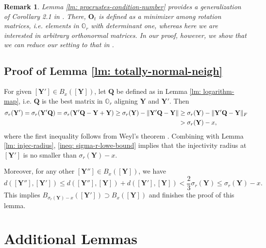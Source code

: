 \documentclass[11pt]{article}
\newtheorem{Remark}{Remark}
\newcommand{\0}{{\mathbf{0}}}
\newcommand{\1}{{\mathbf{1}}}
\renewcommand{\O}{{\mathbf{O}}}
\newcommand{\Q}{{\mathbf{Q}}}
\newcommand{\Y}{{\mathbf{Y}}}
\newcommand{\F}{{\rm F}}
\newcommand{\nc}{\normalcolor}
\begin{document}
 
\begin{Remark}
Lemma \ref{lm: procrustes-condition-number} provides a generalization of Corollary 2.1 in \cite{soderkvist1993perturbation}. There,  $\O_t$ is defined as a minimizer among \textit{rotation} matrices, i.e. elements in $\mathbb{O}_r$ with determinant one, whereas here we are interested in arbitrary orthonormal matrices. In our proof, however, we show that we can reduce our setting to that in \cite{soderkvist1993perturbation}.
\end{Remark}



\nc



\subsection{Proof of Lemma \ref{lm: totally-normal-neigh}} \label{proof-sec: lm-totally-normal-neigh}
	For given $[\Y'] \in B_x([\Y])$,  let $\Q$ be defined as in Lemma \ref{lm: logarithm-map}, i.e. $\Q$ is the best matrix in $\mathbb{O}_r$ aligning $\Y$ and $\Y'$\nc. Then
	\begin{equation} \label{ineq: sigma-r-lowe-bound}
		\begin{split}
			\sigma_r(\Y') = \sigma_r(\Y' \Q) = \sigma_r(\Y' \Q - \Y + \Y) \geq \sigma_r(\Y) - \|\Y' \Q - \Y\| &\geq \sigma_r(\Y) - \|\Y' \Q - \Y\|_\F\\
			& > \sigma_r(\Y) - x,
		\end{split}
	\end{equation}
	 where the first inequality follows from Weyl's theorem \cite[Theorem  4.29]{stewart1998matrix}\nc.
	Combining with Lemma \ref{lm: injec-radius}, \eqref{ineq: sigma-r-lowe-bound} implies that the injectivity radius at $[\Y']$ is no smaller than $\sigma_r(\Y) - x$.
	
	Moreover, for any other $[\Y''] \in B_x([\Y])$, we have
\begin{equation*}
	d([\Y''],[\Y']) \leq d([\Y''],[\Y]) + d([\Y'],[\Y]) < \frac{2}{3} \sigma_r(\Y) \leq \sigma_r(\Y) - x.
\end{equation*} This implies $B_{\sigma_r(\Y) - x}([\Y']) \supset B_x([\Y]) $ and finishes the proof of this lemma.


\section{Additional Lemmas} \label{proof-sec: additional-lemmas}
\end{document}
